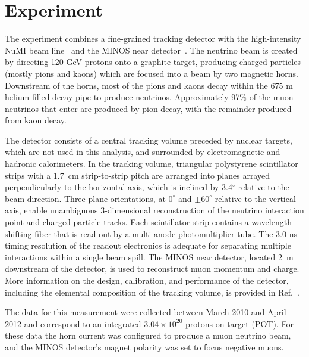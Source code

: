 \section{\minerva Experiment}
\label{sec:expt}
The \minerva experiment combines a fine-grained tracking detector with the high-intensity 
NuMI beam line~\cite{Anderson:1998zza} and the MINOS near detector~\cite{Michael:2008bc}.  
The neutrino beam is created by directing 120 GeV protons onto a graphite target, producing charged 
particles (mostly pions and kaons) which are focused into a 
beam by two magnetic horns.  Downstream of the horns, most of the pions and kaons decay within 
the 675 m helium-filled decay pipe to produce neutrinos.  Approximately 97\% of the muon neutrinos that enter \minerva 
are produced by pion decay, with the remainder produced from kaon decay.

The \minerva detector consists of a central tracking volume 
preceded by nuclear targets, which are not used in this analysis, and surrounded by electromagnetic 
and hadronic calorimeters.
In the tracking volume, triangular polystyrene scintillator strips with a 1.7~cm strip-to-strip pitch are arranged into planes
arrayed perpendicularly to the horizontal axis, which is inclined by 3.4$^\circ$
relative to the beam direction.  
Three plane orientations, at $0^\circ$ and $\pm 60^\circ$ relative to the vertical axis, enable 
unambiguous 3-dimensional reconstruction of the neutrino
interaction point and charged particle tracks.  Each scintillator strip contains a wavelength-shifting fiber 
that is read out by a multi-anode photomultiplier tube.  The 3.0 ns timing resolution of the readout electronics is 
adequate for separating multiple interactions within a single beam spill.   
The MINOS near detector, located 2~m downstream of the \minerva detector, 
is used to reconstruct muon momentum and charge.  More information on the design, calibration, and performance of 
the \minerva detector, including the elemental composition of the tracking volume, is provided in Ref.~\cite{minerva_nim}.

The data for this measurement were collected 
between March 2010 and April 2012 and correspond to an integrated $3.04\times 10^{20}$ protons on 
target (POT).  For these data the horn current was configured to produce 
a muon neutrino beam, and the MINOS detector's magnet polarity was set to focus negative muons.   

